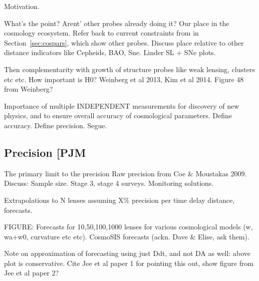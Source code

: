 Motivation.



What's the point? Arent' other probes already doing it? Our place in the
cosmology ecosystem. Refer back to current constraints from \citet{Suy++13} in
Section~\ref{sec:cospars}, which show other probes.
Discuss place relative to other distance indicators
like Cepheids, BAO, Sne. Linder SL + SNe plots.

Then complementarity with growth of structure
probes like weak lensing, clusters etc etc. How important is H0?
Weinberg et al 2013, Kim et al 2014. Figure 48 from Weinberg?

Importance of multiple INDEPENDENT measurements for discovery of new
physics, and to ensure overall accuracy of cosmological parameters.
Define accuracy. Define precision. Segue.



\subsection{Precision [PJM}

The primary limit to the precision
Raw precision from Coe \& Moustakas 2009.
Discuss: Sample size. Stage 3, stage 4 surveys. Monitoring solutions.

Extrapolations to N lenses assuming X\% precision per time delay
distance, forecasts.

FIGURE: Forecasts for 10,50,100,1000 lenses for various cosmological
models (w, wa+w0, curvature etc etc). CosmoSIS forecasts (ackn. Dave \&
Elise, ask them).

Note on approximation of forecasting using just Ddt,
and not DA as well: above plot is conservative.
Cite Jee et al paper 1 for pointing this out,
show figure from Jee et al paper 2?



